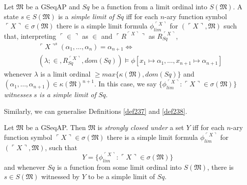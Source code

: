 \documentclass[12pt]{article}
\numberwithin{equation}{section}
\begin{document}
\begin{defi}\label{def256}
Let $\mathfrak{M}$ be a GSeqAP and $Sq$ be a function from a limit ordinal into $S(\mathfrak{M})$. A state $s \in S(\mathfrak{M})$ is a \emph{simple limit of} $Sq$ iff for each $n$-ary function symbol $\ulcorner X \urcorner \in \sigma(\mathfrak{M})$ there is a simple limit formula $\phi_{lim}^{\ulcorner X \urcorner}$ for $(\ulcorner X \urcorner, \mathfrak{M})$ such that, interpreting $\ulcorner \in \urcorner$ as $\in$ and $\ulcorner R^{\ulcorner X \urcorner} \urcorner$ as $R_{Sq}^{\ulcorner X \urcorner}$, 
\begin{align*}
    & \ulcorner X \urcorner^s (\alpha_1, \dots, \alpha_n) = \alpha_{n+1} \iff \\
    & (\lambda; \in, R_{Sq}^{\ulcorner X \urcorner}, dom(Sq)) \models \phi[x_1 \mapsto \alpha_1, \dots, x_{n+1} \mapsto \alpha_{n+1}]
\end{align*}
whenever $\lambda$ is a limit ordinal $\geq max\{\kappa(\mathfrak{M}), dom(Sq)\}$ and $(\alpha_1, \dots, \alpha_{n+1}) \in \kappa(\mathfrak{M})^{n+1}$. In this case, we say $\{\phi_{lim}^{\ulcorner X \urcorner} : \ulcorner X \urcorner \in \sigma(\mathfrak{M})\}$ \emph{witnesses} $s$ \emph{is a simple limit of} $Sq$.
\end{defi}

Similarly, we can generalise Definitions \ref{def237} and \ref{def238}.

\begin{defi}\label{def257p}
Let $\mathfrak{M}$ be a GSeqAP. Then $\mathfrak{M}$ is \emph{strongly closed under} a set $Y$ iff for each $n$-ary function symbol $\ulcorner X \urcorner \in \sigma(\mathfrak{M})$ there is a simple limit formula $\phi_{lim}^{\ulcorner X \urcorner}$ for $(\ulcorner X \urcorner, \mathfrak{M})$, such that 
\begin{equation*}
    Y = \{\phi_{lim}^{\ulcorner X \urcorner} : \ulcorner X \urcorner \in \sigma(\mathfrak{M})\}
\end{equation*}
and whenever $Sq$ is a function from some limit ordinal into $S(\mathfrak{M})$, there is $s \in S(\mathfrak{M})$ witnessed by $Y$ to be a simple limit of $Sq$.
\end{defi}
\end{document}
